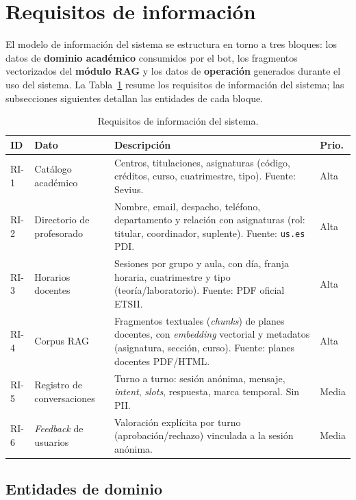 \section{Requisitos de información}\label{sec:req-informacion}

El modelo de información del sistema se estructura en torno a tres bloques: los datos de \textbf{dominio académico} consumidos por el bot, los fragmentos vectorizados del \textbf{módulo RAG} y los datos de \textbf{operación} generados durante el uso del sistema. La Tabla~\ref{tab:ri} resume los requisitos de información del sistema; las subsecciones siguientes detallan las entidades de cada bloque.

\begin{table}[hbtp]
\centering
\small
\caption{Requisitos de información del sistema.}\label{tab:ri}
\begin{tabular}{|p{1.1cm}|p{3.5cm}|p{6.8cm}|p{1.0cm}|}
\hline
\textbf{ID} & \textbf{Dato} & \textbf{Descripción} & \textbf{Prio.} \\ \hline
RI-1 & Catálogo académico & Centros, titulaciones, asignaturas (código, créditos, curso, cuatrimestre, tipo). Fuente: Sevius. & Alta \\ \hline
RI-2 & Directorio de profesorado & Nombre, email, despacho, teléfono, departamento y relación con asignaturas (rol: titular, coordinador, suplente). Fuente: \texttt{us.es} PDI. & Alta \\ \hline
RI-3 & Horarios docentes & Sesiones por grupo y aula, con día, franja horaria, cuatrimestre y tipo (teoría/laboratorio). Fuente: PDF oficial ETSII. & Alta \\ \hline
RI-4 & Corpus RAG & Fragmentos textuales (\textit{chunks}) de planes docentes, con \textit{embedding} vectorial y metadatos (asignatura, sección, curso). Fuente: planes docentes PDF/HTML. & Alta \\ \hline
RI-5 & Registro de conversaciones & Turno a turno: sesión anónima, mensaje, \textit{intent}, \textit{slots}, respuesta, marca temporal. Sin PII. & Media \\ \hline
RI-6 & \textit{Feedback} de usuarios & Valoración explícita por turno (aprobación/rechazo) vinculada a la sesión anónima. & Media \\ \hline
\end{tabular}
\end{table}

\subsection{Entidades de dominio}\label{subsec:ri-dominio}

